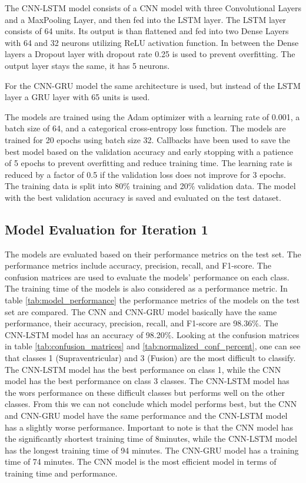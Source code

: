 The CNN-LSTM model consists of a CNN model with three Convolutional Layers and a MaxPooling Layer, and then fed into the LSTM layer. The LSTM layer consists of 64 units. Its output is than flattened and fed into two Dense Layers with 64 and 32 neurons utilizing ReLU activation function. In between the Dense layers a Dropout layer with dropout rate 0.25 is used to prevent overfitting.
The output layer stays the same, it has 5 neurons.

For the CNN-GRU model the same architecture is used, but instead of the LSTM layer a GRU layer with 65 units is used.

The models are trained using the Adam optimizer with a learning rate of 0.001, a batch size of 64, and a categorical cross-entropy loss function. The models are trained for 20 epochs using batch size 32. Callbacks have been used to save the best model based on the validation accuracy and early stopping with a patience of 5 epochs to prevent overfitting and reduce training time. The learning rate is reduced by a factor of 0.5 if the validation loss does not improve for 3 epochs.
The training data is split into 80\% training and 20\% validation data. The model with the best validation accuracy is saved and evaluated on the test dataset.

\subsection{Model Evaluation for Iteration 1}
The models are evaluated based on their performance metrics on the test set. The performance metrics include accuracy, precision, recall, and F1-score. The confusion matrices are used to evaluate the models' performance on each class. The training time of the models is also considered as a performance metric.
In table \ref{tab:model_performance} the performance metrics of the models on the test set are compared. The CNN and CNN-GRU model basically have the same performance, their accuracy, precision, recall, and F1-score are 98.36\%. The CNN-LSTM model has an accuracy of 98.20\%. Looking at the confusion matrices in table \ref{tab:confusion_matrices} and \ref{tab:normalized_conf_percent}, one can see that classes 1 (Supraventricular) and 3 (Fusion) are the most difficult to classify. The CNN-LSTM model has the best performance on class 1, while the CNN model has the best performance on class 3 classes. The CNN-LSTM model has the wors performance on these difficult classes but performs well on the other classes. From this we can not conclude which model performs best, but the CNN and CNN-GRU model have the same performance and the CNN-LSTM model has a slightly worse performance. Important to note is that the CNN model has the significantly shortest training time of 8minutes, while the CNN-LSTM model has the longest training time of 94 minutes. The CNN-GRU model has a training time of 74 minutes. The CNN model is the most efficient model in terms of training time and performance.

